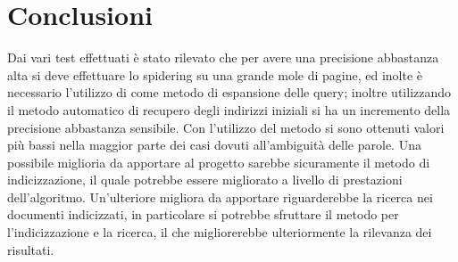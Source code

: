 \chapter{Conclusioni}
Dai vari test effettuati è stato rilevato che per avere una precisione abbastanza alta si deve effettuare lo spidering su una grande mole di pagine, ed inolte è necessario l'utilizzo di  come metodo di espansione delle query; inoltre utilizzando il metodo automatico di recupero degli indirizzi iniziali si ha un incremento della precisione abbastanza sensibile. Con l'utilizzo del metodo  si sono ottenuti valori più bassi nella maggior parte dei casi dovuti all'ambiguità delle parole. Una possibile miglioria da apportare al progetto sarebbe sicuramente il metodo di indicizzazione, il quale potrebbe essere migliorato a livello di prestazioni dell'algoritmo. Un'ulteriore migliora da apportare riguarderebbe la ricerca nei documenti indicizzati, in particolare si potrebbe sfruttare il metodo  per l'indicizzazione e la ricerca, il che migliorerebbe ulteriormente la rilevanza dei risultati.
